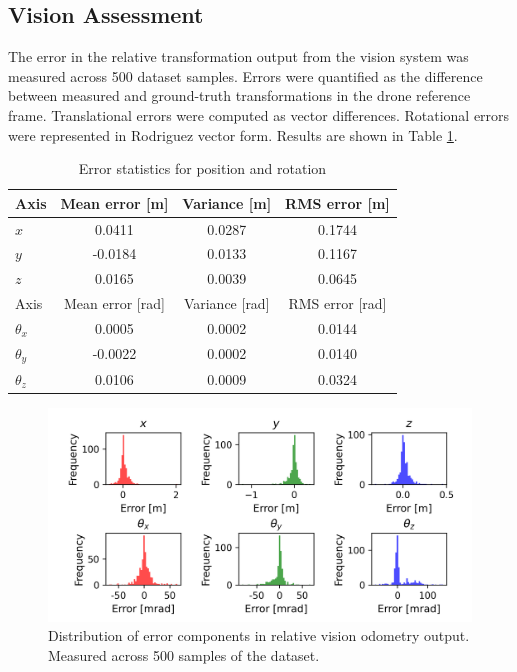 \documentclass[bare_jrnl_transmag]{subfiles}
\begin{document}
\subsection{Vision Assessment}
The error in the relative transformation output from the vision system was measured across 500 dataset samples. Errors were quantified as the difference between measured and ground-truth transformations in the drone reference frame. Translational errors were computed as vector differences. Rotational errors were represented in Rodriguez vector form. Results are shown in Table \ref{tab:vision-error-stats}.

\begin{table}[htbp]
    \centering
    \begin{tabular}{lccc}
    \hline
    Axis & Mean error [m] & Variance [m] & RMS error [m] \\ \hline
    $x$ & 0.0411 & 0.0287 & 0.1744 \\
    $y$ & -0.0184 & 0.0133 & 0.1167 \\
    $z$ & 0.0165 & 0.0039 & 0.0645 \\ \hline
    Axis & Mean error [rad] & Variance [rad] & RMS error [rad] \\ \hline
    $\theta_x$ & 0.0005 & 0.0002 & 0.0144 \\
    $\theta_y$ & -0.0022 & 0.0002 & 0.0140 \\
    $\theta_z$ & 0.0106 & 0.0009 & 0.0324 \\ \hline
    \end{tabular}
    \caption{Error statistics for position and rotation}
    \label{tab:vision-error-stats}
\end{table}

\begin{figure}[htbp]
    \centering
    \includegraphics[width=0.9\linewidth]{figures/vision_error.png}
    \caption{Distribution of error components in relative vision odometry output. Measured across 500 samples of the dataset.}
    \label{fig:vision-error-results}
\end{figure}
\end{document}

